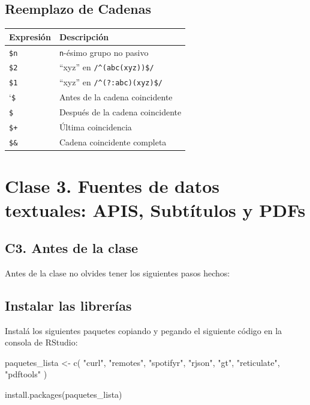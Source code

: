 \documentclass[
  letterpaper,
  DIV=11,
  numbers=noendperiod]{scrreprt}
\newenvironment{Shaded}{\begin{snugshade}}{\end{snugshade}}
\newcommand{\FunctionTok}[1]{\textcolor[rgb]{0.28,0.35,0.67}{#1}}
\newcommand{\NormalTok}[1]{\textcolor[rgb]{0.00,0.23,0.31}{#1}}
\newcommand{\OtherTok}[1]{\textcolor[rgb]{0.00,0.23,0.31}{#1}}
\newcommand{\StringTok}[1]{\textcolor[rgb]{0.13,0.47,0.30}{#1}}
\begin{document}
\chapter{Reemplazo de Cadenas}\label{reemplazo-de-cadenas}

\begin{longtable}[]{@{}ll@{}}
\toprule\noalign{}
Expresión & Descripción \\
\midrule\noalign{}
\endhead
\bottomrule\noalign{}
\endlastfoot
\texttt{\$n} & \texttt{n}-ésimo grupo no pasivo \\
\texttt{\$2} & ``xyz'' en \texttt{/\^{}(abc(xyz))\$/} \\
\texttt{\$1} & ``xyz'' en \texttt{/\^{}(?:abc)(xyz)\$/} \\
`\texttt{\$} & Antes de la cadena coincidente \\
\texttt{\$\textquotesingle{}} & Después de la cadena coincidente \\
\texttt{\$+} & Última coincidencia \\
\texttt{\$\&} & Cadena coincidente completa \\
\end{longtable}

\part{\textbf{Clase 3. Fuentes de datos textuales: APIS, Subtítulos y
PDFs}}

\chapter{C3. Antes de la clase}\label{c3.-antes-de-la-clase}

Antes de la clase no olvides tener los siguientes pasos hechos:

\chapter{Instalar las librerías}\label{instalar-las-libreruxedas}

Instalá los siguientes paquetes copiando y pegando el siguiente código
en la consola de RStudio:

\begin{Shaded}
\begin{Highlighting}[]

\NormalTok{paquetes\_lista }\OtherTok{\textless{}{-}} \FunctionTok{c}\NormalTok{(}
  \StringTok{"curl"}\NormalTok{, }\StringTok{"remotes"}\NormalTok{, }\StringTok{"spotifyr"}\NormalTok{, }\StringTok{"rjson"}\NormalTok{, }\StringTok{"gt"}\NormalTok{, }\StringTok{"reticulate"}\NormalTok{, }\StringTok{"pdftools"}
\NormalTok{)}

\FunctionTok{install.packages}\NormalTok{(paquetes\_lista)}
\end{Highlighting}
\end{Shaded}
\end{document}
